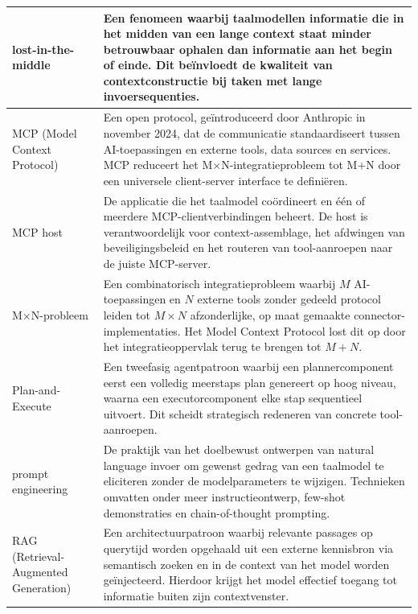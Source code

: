 \begin{longtable}{p{} p{}}
lost-in-the-middle &
    Een fenomeen waarbij taalmodellen informatie die in het midden van een lange context staat minder betrouwbaar ophalen dan informatie aan het begin of einde. Dit beïnvloedt de kwaliteit van contextconstructie bij taken met lange invoersequenties. \\
\midrule

MCP \newline \small(Model Context Protocol) &
    Een open protocol, geïntroduceerd door Anthropic in november 2024, dat de communicatie standaardiseert tussen AI-toepassingen en externe tools, data sources en services. MCP reduceert het M$\times$N-integratieprobleem tot M$+$N door een universele client-server interface te definiëren. \\
\midrule

MCP host &
    De applicatie die het taalmodel coördineert en één of meerdere MCP-clientverbindingen beheert. De host is verantwoordelijk voor context-assemblage, het afdwingen van beveiligingsbeleid en het routeren van tool-aanroepen naar de juiste MCP-server. \\
\midrule

M$\times$N-probleem &
    Een combinatorisch integratieprobleem waarbij $M$ AI-toepassingen en $N$ externe tools zonder gedeeld protocol leiden tot $M \times N$ afzonderlijke, op maat gemaakte connector-implementaties. Het Model Context Protocol lost dit op door het integratieoppervlak terug te brengen tot $M + N$. \\
\midrule



Plan-and-Execute &
    Een tweefasig agentpatroon waarbij een plannercomponent eerst een volledig meerstaps plan genereert op hoog niveau, waarna een executorcomponent elke stap sequentieel uitvoert. Dit scheidt strategisch redeneren van concrete tool-aanroepen. \\
\midrule

prompt engineering &
    De praktijk van het doelbewust ontwerpen van natural language invoer om gewenst gedrag van een taalmodel te eliciteren zonder de modelparameters te wijzigen. Technieken omvatten onder meer instructieontwerp, few-shot demonstraties en chain-of-thought prompting. \\
\midrule

RAG \newline \small(Retrieval-Augmented Generation) &
    Een architectuurpatroon waarbij relevante passages op querytijd worden opgehaald uit een externe kennisbron via semantisch zoeken en in de context van het model worden geïnjecteerd. Hierdoor krijgt het model effectief toegang tot informatie buiten zijn contextvenster. \\
\midrule


\end{longtable}
